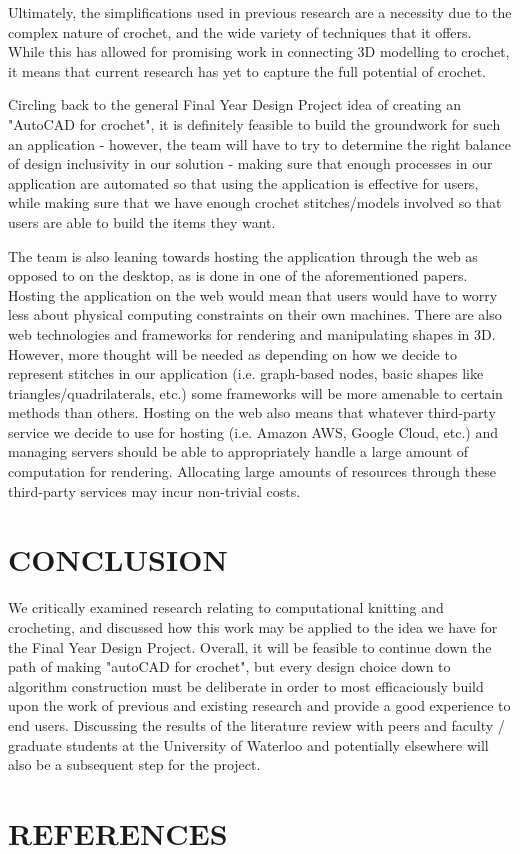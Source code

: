 \documentclass{IEEEcsmag}
\begin{document}
Ultimately, the simplifications used in previous research are a necessity due
to the complex nature of crochet, and the wide variety of techniques that it
offers. While this has allowed for promising work in connecting 3D modelling to
crochet, it means that current research has yet to capture the full potential
of crochet.

Circling back to the general Final Year Design Project idea of creating an
"AutoCAD for crochet", it is definitely feasible to build the groundwork for
such an application - however, the team will have to try to determine the right
balance of design inclusivity in our solution - making sure that enough
processes in our application are automated so that using the application is
effective for users, while making sure that we have enough crochet
stitches/models involved so that users are able to build the items they want.

The team is also leaning towards hosting the application through the web as
opposed to on the desktop, as is done in one of the aforementioned papers.
Hosting the application on the web would mean that users would have to worry
less about physical computing constraints on their own machines. There are also
web technologies and frameworks for rendering and manipulating shapes in 3D.
However, more thought will be needed as depending on how we decide to represent
stitches in our application (i.e. graph-based nodes, basic shapes like
triangles/quadrilaterals, etc.) some frameworks will be more amenable to
certain methods than others. Hosting on the web also means that whatever
third-party service we decide to use for hosting (i.e. Amazon AWS, Google
Cloud, etc.) and managing servers should be able to appropriately handle a
large amount of computation for rendering. Allocating large amounts of
resources through these third-party services may incur non-trivial costs.

\section{CONCLUSION}
We critically examined research relating to computational knitting and
crocheting, and discussed how this work may be applied to the idea we have for
the Final Year Design Project. Overall, it will be feasible to continue down
the path of making "autoCAD for crochet", but every design choice down to
algorithm construction must be deliberate in order to most efficaciously build
upon the work of previous and existing research and provide a good experience
to end users. Discussing the results of the literature review with peers and
faculty / graduate students at the University of Waterloo and potentially
elsewhere will also be a subsequent step for the project.

\section{REFERENCES}
\nocite{*} %
\printbibliography[heading=none]
\end{document}
